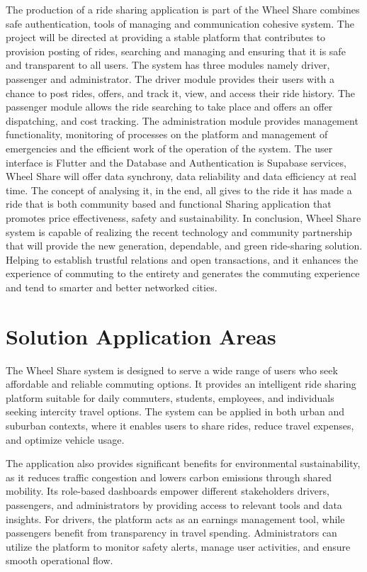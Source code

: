 The production of a ride sharing application is part of the Wheel Share combines safe authentication, tools of managing and communication cohesive system. The project will be directed at providing a stable platform that contributes to provision posting of rides, searching and managing and ensuring that it is safe and transparent to all users.
The system has three modules namely driver, passenger and administrator. The driver module provides their users with a chance to post rides, offers, and track it, view, and access their ride history. The passenger module allows the ride searching to take place and offers an offer dispatching, and cost tracking. The administration module provides management functionality, monitoring of processes on the platform and management of emergencies and the efficient work of the operation of the system. The user interface is Flutter and the Database and Authentication is Supabase services, Wheel Share will offer data synchrony, data reliability and data efficiency at real time. The concept of analysing it, in the end, all gives to the ride it has made a ride that is both community based and functional Sharing application that promotes price effectiveness, safety and sustainability.
In conclusion, Wheel Share system is capable of realizing the recent technology and community partnership that will provide the new generation, dependable, and green ride-sharing solution. Helping to establish trustful relations and open transactions, and it enhances the experience of commuting to the entirety and generates the commuting experience and 
tend to smarter and better networked cities.


\section{Solution Application Areas}

The Wheel Share system is designed to serve a wide range of users who seek affordable and reliable commuting options. It provides an intelligent ride sharing platform suitable for daily commuters, students, employees, and individuals seeking intercity travel options. The system can be applied in both urban and suburban contexts, where it enables users to share rides, reduce travel expenses, and optimize vehicle usage.

The application also provides significant benefits for environmental sustainability, as it reduces traffic congestion and lowers carbon emissions through shared mobility. Its role-based dashboards empower different stakeholders drivers, passengers, and administrators by providing access to relevant tools and data insights\cite{soria2021}. For drivers, the platform acts as an earnings management tool, while passengers benefit from transparency in travel spending. Administrators can utilize the platform to monitor safety alerts, manage user activities, and ensure smooth operational flow.


